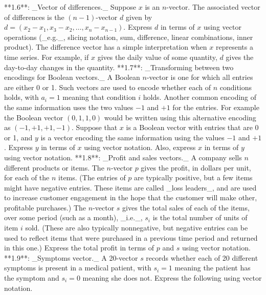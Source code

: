 

**1.6**: _Vector of differences._ Suppose \(x\) is an \(n\)-vector. The associated vector of differences is the \((n-1)\)-vector \(d\) given by \(d=(x_{2}-x_{1},x_{3}-x_{2},\ldots,x_{n}-x_{n-1})\). Express \(d\) in terms of \(x\) using vector operations (_e.g._, slicing notation, sum, difference, linear combinations, inner product). The difference vector has a simple interpretation when \(x\) represents a time series. For example, if \(x\) gives the daily value of some quantity, \(d\) gives the day-to-day changes in the quantity.
**1.7**: _Transforming between two encodings for Boolean vectors._ A Boolean \(n\)-vector is one for which all entries are either 0 or 1. Such vectors are used to encode whether each of \(n\) conditions holds, with \(a_{i}=1\) meaning that condition \(i\) holds. Another common encoding of the same information uses the two values \(-1\) and \(+1\) for the entries. For example the Boolean vector \((0,1,1,0)\) would be written using this alternative encoding as \((-1,+1,+1,-1)\). Suppose that \(x\) is a Boolean vector with entries that are 0 or 1, and \(y\) is a vector encoding the same information using the values \(-1\) and \(+1\). Express \(y\) in terms of \(x\) using vector notation. Also, express \(x\) in terms of \(y\) using vector notation.
**1.8**: _Profit and sales vectors._ A company sells \(n\) different products or items. The \(n\)-vector \(p\) gives the profit, in dollars per unit, for each of the \(n\) items. (The entries of \(p\) are typically positive, but a few items might have negative entries. These items are called _loss leaders_, and are used to increase customer engagement in the hope that the customer will make other, profitable purchases.) The \(n\)-vector \(s\) gives the total sales of each of the items, over some period (such as a month), _i.e._, \(s_{i}\) is the total number of units of item \(i\) sold. (These are also typically nonnegative, but negative entries can be used to reflect items that were purchased in a previous time period and returned in this one.) Express the total profit in terms of \(p\) and \(s\) using vector notation.
**1.9**: _Symptoms vector._ A 20-vector \(s\) records whether each of 20 different symptoms is present in a medical patient, with \(s_{i}=1\) meaning the patient has the symptom and \(s_{i}=0\) meaning she does not. Express the following using vector notation.

